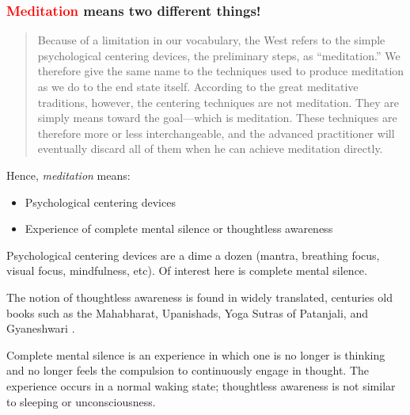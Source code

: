 \documentclass[10pt,utf8x]{beamer}
\begin{document}
\begin{frame}
\frametitle{\textcolor{red}{Meditation} means two different things!}

\begin{quotation}
Because of a limitation in our vocabulary, the West refers to the simple
psychological centering devices, the preliminary steps, as ``meditation.''
We therefore give the same name to the techniques used to produce
meditation as we do to the end state itself. According to the great
meditative traditions, however, the centering techniques are not
meditation. They are simply means toward the goal---which is meditation.
These techniques are therefore more or less interchangeable, and the
advanced practitioner will eventually discard all of them when he can
achieve meditation directly. \cite[pp.~8--9]{carrington1977}
\end{quotation}

Hence, \emph{meditation} means:
\begin{itemize}
\item Psychological centering devices
\item Experience of complete mental silence or thoughtless awareness
\end{itemize}
\end{frame}  

\begin{frame}  
Psychological centering devices are a dime a dozen (mantra, breathing focus,
visual focus, mindfulness, etc).
Of interest here is complete mental silence.

The notion of thoughtless awareness is found in widely translated,
centuries old
books such as the Mahabharat, Upanishads, Yoga Sutras of Patanjali,
and Gyaneshwari \cite[pp.~93--94]{manocha2009}.

Complete mental silence is an experience in which one is
no longer is thinking and
no longer feels the compulsion to continuously engage in thought.
The experience occurs in a normal waking state;
thoughtless awareness is not similar to sleeping or unconsciousness.
\end{frame}
\end{document}
